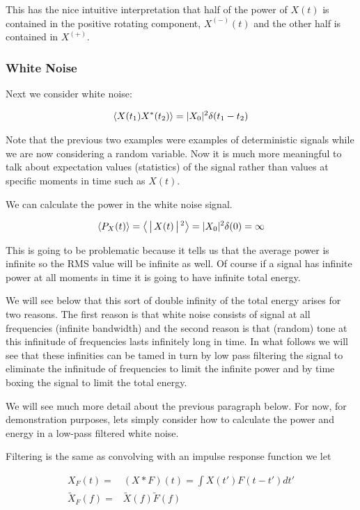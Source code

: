\documentclass[12pt]{article}
\begin{document}
This has the nice intuitive interpretation that half of the power of $X(t)$ is contained in the positive rotating component, $X^{(-)}(t)$ and the other half is contained in $X^{(+)}$.

\subsubsection{White Noise}

Next we consider white noise:

\begin{align}
\Braket{X(t_1)X^*(t_2)} = |X_0|^2 \delta(t_1-t_2)
\end{align}

Note that the previous two examples were examples of deterministic signals while we are now considering a random variable. 
Now it is much more meaningful to talk about expectation values (statistics) of the signal rather than values at specific moments in time such as $X(t)$.

We can calculate the power in the white noise signal.

\begin{align}
\braket{P_X(t)} = \Braket{|X(t)|^2} = |X_0|^2 \delta(0) = \infty\\
\end{align}

This is going to be problematic because it tells us that the average power is infinite so the RMS value will be infinite as well.
Of course if a signal has infinite power at all moments in time it is going to have infinite total energy.

We will see below that this sort of double infinity of the total energy arises for two reasons. 
The first reason is that white noise consists of signal at all frequencies (infinite bandwidth) and the second reason is that (random) tone at this infinitude of frequencies lasts infinitely long in time.
In what follows we will see that these infinities can be tamed in turn by low pass filtering the signal to eliminate the infinitude of frequencies to limit the infinite power and by time boxing the signal to limit the total energy.

We will see much more detail about the previous paragraph below.
For now, for demonstration purposes, lets simply consider how to calculate the power and energy in a low-pass filtered white noise.

Filtering is the same as convolving with an impulse response function we let

\begin{align}
X_F(t) =& (X\ast F)(t) = \int X(t') F(t-t') dt'\\
\tilde{X}_F(f) =&  \tilde{X}(f) \tilde{F}(f)
\end{align}
\end{document}
